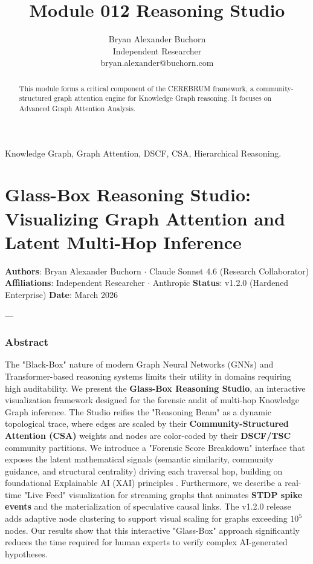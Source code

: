 \documentclass[10pt,journal,compsoc]{IEEEtran}
\begin{document}
\title{Module 012 Reasoning Studio}
\author{Bryan Alexander Buchorn \\ Independent Researcher \\ bryan.alexander@buchorn.com}

\maketitle

\begin{abstract}
This module forms a critical component of the CEREBRUM framework, a community-structured graph attention engine for Knowledge Graph reasoning. It focuses on Advanced Graph Attention Analysis.
\end{abstract}

\begin{IEEEkeywords}
Knowledge Graph, Graph Attention, DSCF, CSA, Hierarchical Reasoning.
\end{IEEEkeywords}

\section{Glass-Box Reasoning Studio: Visualizing Graph Attention and Latent Multi-Hop Inference}

\textbf{Authors}: Bryan Alexander Buchorn $\cdot$ Claude Sonnet 4.6 (Research Collab\-orator)  
\textbf{Affili\-ations}: Independent Researcher $\cdot$ Anthropic  
\textbf{Status}: v1.2.0 (Hardened Enterprise)  
\textbf{Date}: March 2026

---

\subsubsection{Abstract}
The "Black-Box" nature of modern Graph Neural Networks (GNNs) and Transformer-based reasoning systems limits their utility in domains requiring high audit\-ability. We present the \textbf{Glass-Box Reasoning Studio}, an interactive visua\-lization framework designed for the forensic audit of multi-hop Knowledge Graph inference. The Studio reifies the "Reasoning Beam" as a dynamic topological trace, where edges are scaled by their \textbf{Community-Structured Attention (CSA)} weights and nodes are color-coded by their \textbf{DSCF/TSC} community partitions. We introduce a "Forensic Score Breakdown" interface that exposes the latent mathe\-matical signals (semantic similarity, community guidance, and structural centrality) driving each traversal hop, building on found\-ational Explainable AI (XAI) principles \cite{samek2017explainable, ribeiro2016lime, lundberg2017shap}. Furthermore, we describe a real-time "Live Feed" visua\-lization for streaming graphs that animates \textbf{STDP spike events} and the mater\-ialization of speculative causal links. The v1.2.0 release adds adaptive node clustering to support visual scaling for graphs exceeding $10^5$ nodes. Our results show that this interactive "Glass-Box" approach signi\-ficantly reduces the time required for human experts to verify complex AI-generated hypotheses.
\end{document}
